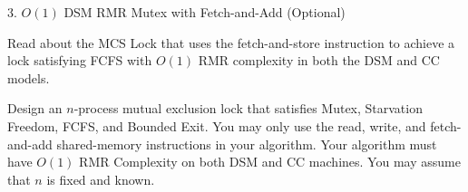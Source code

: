 \documentclass[12pt]{article}
\begin{document}
\newpage

\begin{problem}{3. $O(1)$ DSM RMR Mutex with Fetch-and-Add (Optional)}
        
    Read about the MCS Lock that uses the fetch-and-store instruction to achieve a lock satisfying FCFS with $O(1)$ RMR complexity in both the DSM and CC models.

    Design an $n$-process mutual exclusion lock that satisfies Mutex, Starvation Freedom, FCFS, and Bounded Exit. You may only use the read, write, and fetch-and-add shared-memory instructions in your algorithm. Your algorithm must have $O(1)$ RMR Complexity on both DSM and CC machines. You may assume that $n$ is fixed and known.
\end{problem}
\end{document}
